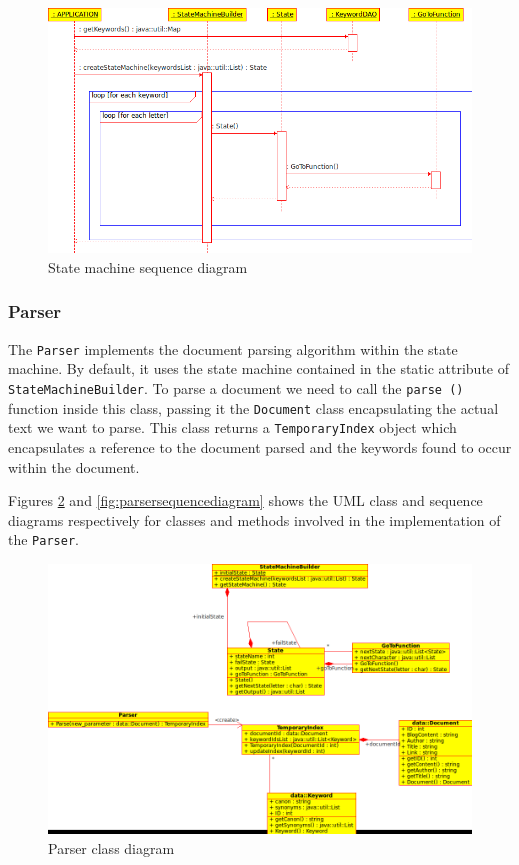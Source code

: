 \documentclass[10pt]{report}
\begin{document}
\begin{figure}
  \begin{center}
        \includegraphics[width=\textwidth,height=!]{statemachinesequencediagram}
  \end{center}
  \caption{State machine sequence diagram}
  \label{fig:statemachinesequencediagram}
\end{figure} 


\subsubsection{Parser}
The \texttt{Parser} implements the document parsing algorithm within
the state machine. By default, it uses the state machine contained
in the static attribute of \texttt{StateMachineBuilder}. To parse a
document we need to call the \texttt{parse ()} function inside this
class, passing it the \texttt{Document} class encapsulating the actual
text we want to parse. This class returns a \texttt{TemporaryIndex}
object which encapsulates a reference to the document parsed and the
keywords found to occur within the document.

Figures \ref{fig:parserclassdiagram} and
\ref{fig:parsersequencediagram} shows the UML class and sequence
diagrams respectively for classes and methods involved in the
implementation of the \texttt{Parser}.

\begin{figure}
  \begin{center}
        \includegraphics[width=\textwidth,height=!]{parserclassdiagram}
  \end{center}
  \caption{Parser class diagram}
  \label{fig:parserclassdiagram}
\end{figure} 
\end{document}
